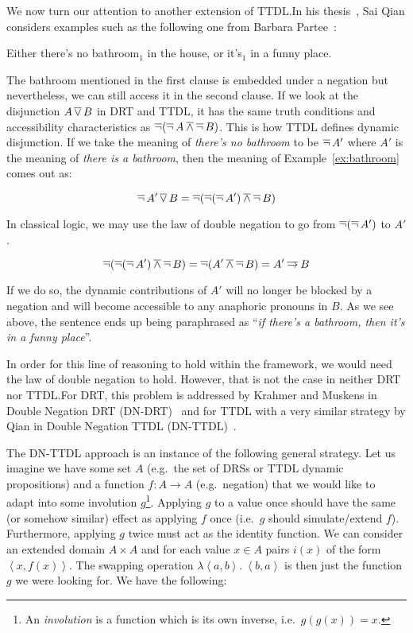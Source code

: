 We now turn our attention to another extension of TTDL.\@ In his
thesis~\cite{qian2014accessibility}, Sai Qian considers examples such as
the following one from Barbara Partee~\cite{roberts1989modal}:

\begin{exe}
  \ex \label{ex:bathroom} Either there's no bathroom$_1$ in the house, or
  it's$_1$ in a funny place.
\end{exe}

The bathroom mentioned in the first clause is embedded under a negation but
nevertheless, we can still access it in the second clause. If we look at
the disjunction $A \mathop{\overline{\lor}} B$ in DRT and TTDL, it has the same truth
conditions and accessibility characteristics as
$\mathop{\overline{\lnot}} (\mathop{\overline{\lnot}} A \mathbin{\overline{\land}} \mathop{\overline{\lnot}} B)$. This is how TTDL defines dynamic
disjunction. If we take the meaning of \emph{there's no bathroom} to be
$\mathop{\overline{\lnot}} A'$ where $A'$ is the meaning of \emph{there is a bathroom}, then
the meaning of Example~\ref{ex:bathroom} comes out as:

$$
\mathop{\overline{\lnot}} A' \mathop{\overline{\lor}} B = \mathop{\overline{\lnot}} (\mathop{\overline{\lnot}} (\mathop{\overline{\lnot}} A') \mathbin{\overline{\land}} \mathop{\overline{\lnot}} B)
$$

In classical logic, we may use the law of double negation to go from
$\mathop{\overline{\lnot}} (\mathop{\overline{\lnot}} A')$ to $A'$.

$$
\mathop{\overline{\lnot}} (\mathop{\overline{\lnot}} (\mathop{\overline{\lnot}} A') \mathbin{\overline{\land}} \mathop{\overline{\lnot}} B) = \mathop{\overline{\lnot}} (A' \mathbin{\overline{\land}} \mathop{\overline{\lnot}} B) = A' \mathbin{\overline{\to}} B
$$

If we do so, the dynamic contributions of $A'$ will no longer be blocked by
a negation and will become accessible to any anaphoric pronouns in $B$. As
we see above, the sentence ends up being paraphrased as ``\emph{if there's
  a bathroom, then it's in a funny place}''.

In order for this line of reasoning to hold within the framework, we would
need the law of double negation to hold. However, that is not the case in
neither DRT nor TTDL.\@ For DRT, this problem is addressed by Krahmer and
Muskens in Double Negation DRT (DN-DRT)~\cite{krahmer1995negation} and for
TTDL with a very similar strategy by Qian in Double Negation TTDL
(DN-TTDL)~\cite{qian2014accessibility}.

The DN-TTDL approach is an instance of the following general strategy. Let
us imagine we have some set $A$ (e.g.\ the set of DRSs or TTDL dynamic
propositions) and a function $f : A \to A$ (e.g.\ negation) that we would
like to adapt into some involution $g$\footnote{An \emph{involution} is a
  function which is its own inverse, i.e.\ $g(g(x)) = x$.}. Applying $g$ to
a value once should have the same (or somehow similar) effect as applying
$f$ once (i.e.\ $g$ should simulate/extend $f$). Furthermore, applying $g$
twice must act as the identity function. We can consider an extended domain
$A \times A$ and for each value $x \in A$ pairs $i(x)$ of the form
$\left<x, f(x)\right>$. The swapping operation
$\lambda \left<a, b\right>.\ \left<b, a\right>$ is then just the function
$g$ we were looking for. We have the following:

